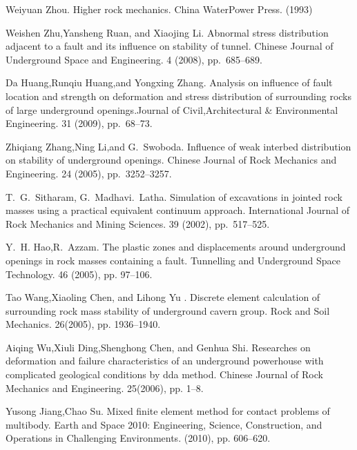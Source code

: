 
\begin{thebibliography}{10}
{\sc Weiyuan Zhou}. {Higher rock mechanics}. China WaterPower Press.  (1993) 

{\sc Weishen Zhu,Yansheng Ruan, and Xiaojing Li}. {Abnormal stress distribution adjacent to a fault and its influence on stability of tunnel}. Chinese Journal of Underground Space and Engineering. 4 (2008), pp.~685--689.

{\sc Da Huang,Runqiu Huang,and Yongxing Zhang}. {Analysis on influence of fault location and strength on deformation and stress distribution of surrounding rocks of large underground openings}.Journal of Civil,Architectural \& Environmental Engineering. 31 (2009), pp.~68--73.

{\sc Zhiqiang Zhang,Ning Li,and G.~Swoboda}. {Influence of weak interbed distribution on stability of underground openings}.  Chinese Journal of Rock Mechanics and Engineering. 24 (2005), pp.~3252--3257.

{\sc T.~G.~Sitharam, G.~Madhavi.~Latha}. {Simulation of excavations in jointed rock masses using a practical equivalent continuum approach}. International Journal of Rock Mechanics and Mining Sciences. 39 (2002), pp.~517--525.

{\sc Y.~H. Hao,R.~Azzam}.
\newblock The plastic zones and displacements around underground openings in rock masses containing a fault.
\newblock Tunnelling and Underground Space Technology. 46 (2005), pp. 97--106.

{\sc Tao Wang,Xiaoling Chen, and Lihong Yu }.
\newblock Discrete element calculation of surrounding rock mass stability of underground cavern group.
\newblock Rock and Soil Mechanics. 26(2005), pp. 1936--1940.

{\sc Aiqing Wu,Xiuli Ding,Shenghong Chen, and Genhua Shi}.
\newblock Researches on deformation and failure characteristics of an underground powerhouse with complicated geological conditions by dda method.
\newblock Chinese Journal of Rock Mechanics and Engineering. 25(2006), pp. 1--8.

{\sc Yusong Jiang,Chao Su}.
\newblock Mixed finite element method for contact problems of multibody.
\newblock Earth and Space 2010: Engineering, Science, Construction, and Operations in Challenging Environments. (2010), pp. 606--620.
\end{thebibliography}